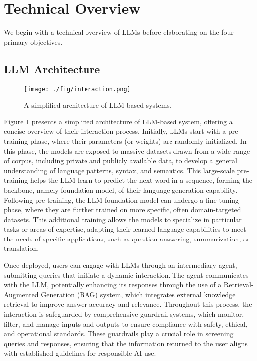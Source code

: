 \section{Technical Overview}

We begin with a technical overview of LLMs before elaborating on the four primary objectives.

\subsection{LLM Architecture}

\begin{figure}[h]
	\centering
	\texttt{[image: ./fig/interaction.png]}
	\caption{A simplified architecture of LLM-based systems.}
	\label{fig:interaction}
\end{figure}

Figure \ref{fig:interaction} presents a simplified architecture of LLM-based system, offering a concise overview of their interaction process. Initially, LLMs start with a pre-training phase, where their parameters (or weights) are randomly initialized. In this phase, the models are exposed to massive datasets drawn from a wide range of corpus, including private and publicly available data, to develop a general understanding of language patterns, syntax, and semantics. This large-scale pre-training helps the LLM learn to predict the next word in a sequence, forming the backbone, namely foundation model, of their language generation capability. Following pre-training, the LLM foundation model can undergo a fine-tuning phase, where they are further trained on more specific, often domain-targeted datasets. This additional training allows the models to specialize in particular tasks or areas of expertise, adapting their learned language capabilities to meet the needs of specific applications, such as question answering, summarization, or translation. 

Once deployed, users can engage with LLMs through an intermediary agent, submitting queries that initiate a dynamic interaction. The agent communicates with the LLM, potentially enhancing its responses through the use of a Retrieval-Augmented Generation (RAG) system, which integrates external knowledge retrieval to improve answer accuracy and relevance. Throughout this process, the interaction is safeguarded by comprehensive guardrail systems, which monitor, filter, and manage inputs and outputs to ensure compliance with safety, ethical, and operational standards. These guardrails play a crucial role in screening queries and responses, ensuring that the information returned to the user aligns with established guidelines for responsible AI use. 


